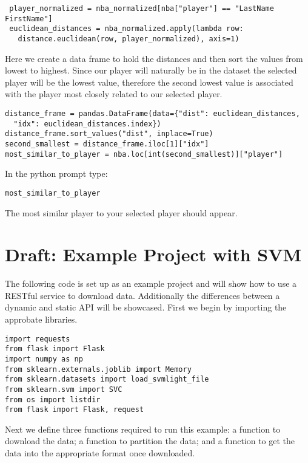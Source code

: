  \begin{lstlisting}
 player_normalized = nba_normalized[nba["player"] == "LastName FirstName"]
 euclidean_distances = nba_normalized.apply(lambda row:
   distance.euclidean(row, player_normalized), axis=1)
\end{lstlisting} 

Here we create a data frame to hold the distances and then sort the
values from lowest to highest. Since our player will naturally be in
the dataset the selected player will be the lowest value, therefore
the second lowest value is associated with the player most closely
related to our selected player.

\begin{lstlisting}
distance_frame = pandas.DataFrame(data={"dist": euclidean_distances,
  "idx": euclidean_distances.index})
distance_frame.sort_values("dist", inplace=True)
second_smallest = distance_frame.iloc[1]["idx"]
most_similar_to_player = nba.loc[int(second_smallest)]["player"]
\end{lstlisting} 

In the python prompt type: 

\begin{lstlisting}
most_similar_to_player 
\end{lstlisting} 

The most similar player to your selected player should appear. 

\section{Draft: Example Project with SVM}

The following code is set up as an example project and will show how
to use a RESTful service to download data. Additionally the
differences between a dynamic and static API will be showcased. First
we begin by importing the approbate libraries. 

\begin{lstlisting}
import requests
from flask import Flask
import numpy as np
from sklearn.externals.joblib import Memory
from sklearn.datasets import load_svmlight_file
from sklearn.svm import SVC
from os import listdir
from flask import Flask, request
\end{lstlisting} 

Next we define three functions required to run this example: a
function to download the data; a function to partition the data; and a
function to get the data into the appropriate format once downloaded. 

